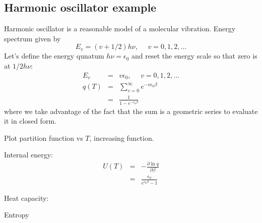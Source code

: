 \documentclass[11pt]{article}
\begin{document}
\subsection{Harmonic oscillator example}
Harmonic oscillator is a reasonable model of a molecular vibration.  Energy
spectrum given by
\begin{equation}
  E_v=(v+1/2)h\nu,~~~~~~v=0,1,2,...
\end{equation}
Let's define the energy qunatum $h\nu=\epsilon_0$ and reset the energy scale so
that zero is at $1/2 h\nu$:
\begin{eqnarray}
  E_v & = & v\epsilon_0,~~~~~~v=0,1,2,... \\
q(T) & = &\sum_{v=0}^\infty e^{-v\epsilon_0\beta} \\
 & = & \frac{1}{1-e^{-\epsilon_0\beta}}
\end{eqnarray}
where we take advantage of the fact that the sum is a geometric series to
evaluate it in closed form. 

Plot partition function vs $T$, increasing function.

\noindent Internal energy:
\begin{eqnarray}
  U(T) &=&-\frac{\partial \ln q}{\partial \beta}\\
   & = & \frac{\epsilon_0}{e^{\epsilon_0\beta}-1}
\end{eqnarray}

\noindent Heat capacity:

\noindent Entropy
\end{document}
